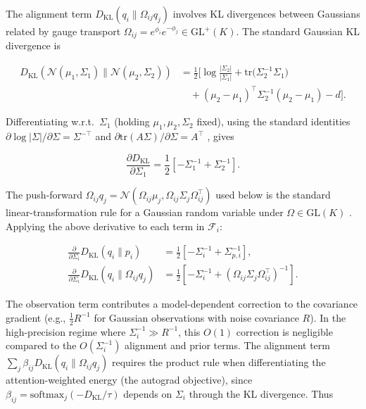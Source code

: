 \documentclass[twoside,11pt]{article}
\begin{document}
The alignment term $D_{\mathrm{KL}}(q_i \| \Omega_{ij} q_j)$ involves KL divergences between Gaussians related by gauge transport $\Omega_{ij} = e^{\phi_i}e^{-\phi_j} \in \mathrm{GL}^+(K)$. The standard Gaussian KL divergence \citep{Bishop2006,murphy2012machine,CoverThomas2006} is

\begin{align}
D_{\mathrm{KL}} \left(
\mathcal{N}(\mu_1, \Sigma_1)
 \|
\mathcal{N}(\mu_2, \Sigma_2)
\right)
&=
\frac{1}{2}
\Big[
\log \frac{|\Sigma_2|}{|\Sigma_1|}
+ \mathrm{tr} \big(\Sigma_2^{-1}\Sigma_1\big)
\\ &\quad
+ (\mu_2 - \mu_1)^\top
  \Sigma_2^{-1}
  (\mu_2 - \mu_1)
- d
\Big].
\label{eq:gaussian_KL}
\end{align}


Differentiating w.r.t.\ $\Sigma_1$ (holding $\mu_1,\mu_2,\Sigma_2$ fixed), using the standard identities $\partial \log|\Sigma|/\partial \Sigma = \Sigma^{-\top}$ and $\partial \mathrm{tr}(A\Sigma)/\partial \Sigma = A^\top$ \citep{petersen2012matrix}, gives

\begin{equation}
\frac{\partial D_{\mathrm{KL}}}{\partial \Sigma_1}
=\frac{1}{2}\left[
-\Sigma_1^{-1}
+ \Sigma_2^{-1}
\right].
\end{equation}

The push-forward $\Omega_{ij} q_j = \mathcal{N}(\Omega_{ij}\mu_j, \Omega_{ij}\Sigma_j\Omega_{ij}^\top)$ used below is the standard linear-transformation rule for a Gaussian random variable under $\Omega \in \mathrm{GL}(K)$ \citep[\S2.3.3]{Bishop2006}. Applying the above derivative to each term in $\mathcal{F}_i$:

\begin{align}
\frac{\partial}{\partial \Sigma_i}
D_{\mathrm{KL}}(q_i \| p_i)
&=\frac{1}{2}\left[
-\Sigma_i^{-1}
+ \Sigma_{p,i}^{-1}
\right],
\\[6pt]
\frac{\partial}{\partial \Sigma_i}
D_{\mathrm{KL}}(q_i \| \Omega_{ij} q_j)
&=
\frac{1}{2}\left[
-\Sigma_i^{-1}
+ (\Omega_{ij}\Sigma_j\Omega_{ij}^\top)^{-1}
\right].
\end{align}

The observation term contributes a model-dependent correction to the covariance gradient (e.g., $\frac{1}{2}R^{-1}$ for Gaussian observations with noise covariance $R$). In the high-precision regime where $\Sigma_i^{-1} \gg R^{-1}$, this $O(1)$ correction is negligible compared to the $O(\Sigma_i^{-1})$ alignment and prior terms. The alignment term $\sum_j \beta_{ij} D_{\mathrm{KL}}(q_i \| \Omega_{ij} q_j)$ requires the product rule when differentiating the attention-weighted energy (the autograd objective), since $\beta_{ij} = \mathrm{softmax}_j(-D_{\mathrm{KL}}/\tau)$ depends on $\Sigma_i$ through the KL divergence. Thus
\end{document}
